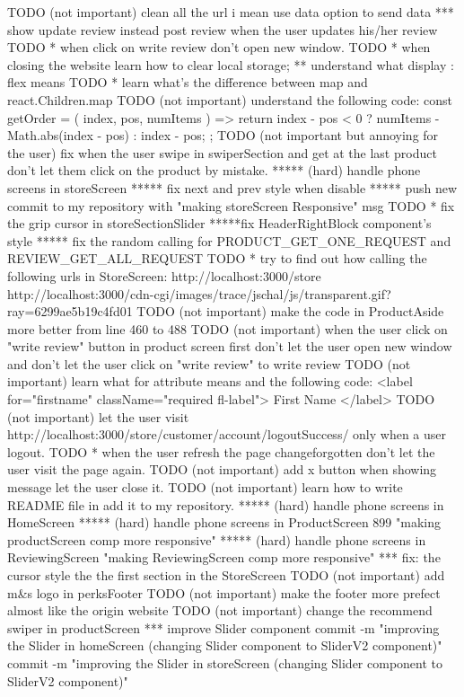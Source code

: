 {TODO (not important) clean all the url i mean use data option to send data 
*** show update review instead post review when the user updates his/her review
TODO * when click on write review don't open new window.
TODO * when closing the website learn how to clear local storage;
** understand what display : flex means
TODO * learn what's the difference between map and react.Children.map
TODO (not important) understand the following code:
      const getOrder = ({ index, pos, numItems }) => {
        return index - pos < 0 ? numItems - Math.abs(index - pos) : index - pos;
      };
TODO (not important but annoying for the user) fix when the user swipe in swiperSection and get at the last product don't let them click on the product by mistake.
 ***** (hard) handle phone screens in storeScreen
 ***** fix next and prev style when disable
***** push new commit to my repository with "making storeScreen Responsive" msg
TODO * fix the grip cursor in storeSectionSlider
*****fix HeaderRightBlock component's style
***** fix the random calling for PRODUCT_GET_ONE_REQUEST and REVIEW_GET_ALL_REQUEST
TODO * try to find out how calling the following urls in StoreScreen:
         http://localhost:3000/store 
         http://localhost:3000/cdn-cgi/images/trace/jschal/js/transparent.gif?ray=6299ae5b19c4fd01 
TODO (not important) make the code in ProductAside more better from line 460 to 488
TODO (not important) when the user click on "write review" button in product screen first don't let the user open new window and don't let the user click on "write review" to write review
TODO (not important) learn what for attribute means and the following code:
      <label for="firstname" className="required fl-label">
                          First Name
                        </label>
TODO (not important) let the user visit http://localhost:3000/store/customer/account/logoutSuccess/ only when a user logout.
TODO *  when the user refresh the page changeforgotten don't let the user visit the page again. 
TODO (not important) add x button when showing message let the user close it. 
TODO (not important) learn how to write README file in add it to my repository.
***** (hard) handle phone screens in HomeScreen
***** (hard) handle phone screens in ProductScreen 899 "making productScreen comp more responsive"
***** (hard) handle phone screens in ReviewingScreen "making ReviewingScreen comp more responsive"
*** fix: the cursor style the the first section in the StoreScreen
TODO (not important) add m&s logo in perksFooter
TODO (not important) make the footer more prefect almost like the origin website
TODO (not important) change the recommend swiper in productScreen
*** improve Slider component
    commit -m "improving the Slider in homeScreen (changing Slider component to SliderV2 component)"
    commit -m "improving the Slider in storeScreen (changing Slider component to SliderV2 component)"

}
